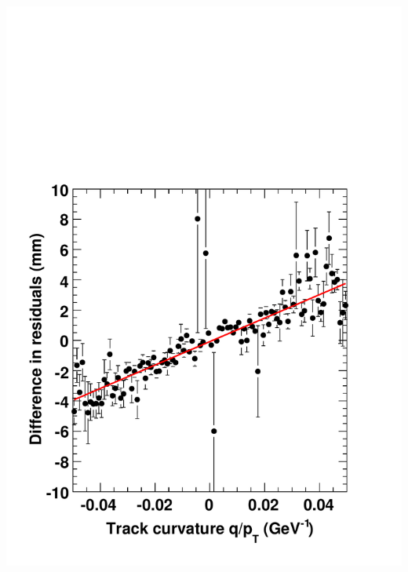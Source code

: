 \documentclass[compress]{beamer}
\begin{document}
\begin{frame}
\begin{columns}
\vspace{0.5 cm}
\includegraphics[width=\linewidth]{demo_qoverpt.pdf}
\end{columns}

\end{frame}
\end{document}
